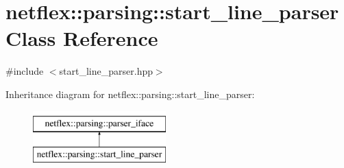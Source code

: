 \hypertarget{classnetflex_1_1parsing_1_1start__line__parser}{}\section{netflex\+:\+:parsing\+:\+:start\+\_\+line\+\_\+parser Class Reference}
\label{classnetflex_1_1parsing_1_1start__line__parser}


{\ttfamily \#include $<$start\+\_\+line\+\_\+parser.\+hpp$>$}

Inheritance diagram for netflex\+:\+:parsing\+:\+:start\+\_\+line\+\_\+parser\+:\begin{figure}[H]
\begin{center}
\leavevmode
\includegraphics[height=2.000000cm]{classnetflex_1_1parsing_1_1start__line__parser}
\end{center}
\end{figure}
